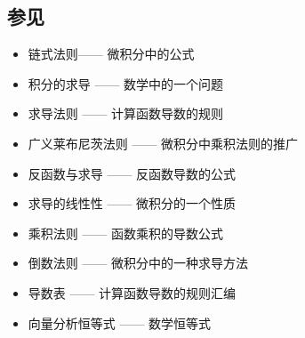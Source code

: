 \subsection{参见}
\begin{itemize}
\item 链式法则—— 微积分中的公式
\item 积分的求导 —— 数学中的一个问题
\item 求导法则 —— 计算函数导数的规则
\item 广义莱布尼茨法则 —— 微积分中乘积法则的推广
\item 反函数与求导 —— 反函数导数的公式
\item 求导的线性性 —— 微积分的一个性质
\item 乘积法则 —— 函数乘积的导数公式
\item 倒数法则 —— 微积分中的一种求导方法
\item 导数表 —— 计算函数导数的规则汇编
\item 向量分析恒等式 —— 数学恒等式
\end{itemize}
